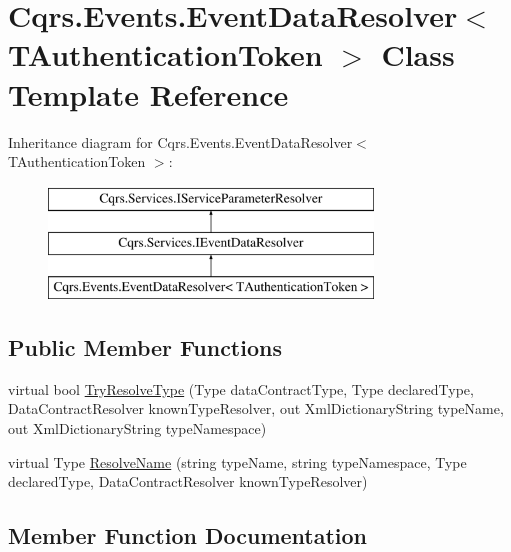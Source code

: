 \hypertarget{classCqrs_1_1Events_1_1EventDataResolver}{}\section{Cqrs.\+Events.\+Event\+Data\+Resolver$<$ T\+Authentication\+Token $>$ Class Template Reference}
\label{classCqrs_1_1Events_1_1EventDataResolver}
Inheritance diagram for Cqrs.\+Events.\+Event\+Data\+Resolver$<$ T\+Authentication\+Token $>$\+:\begin{figure}[H]
\begin{center}
\leavevmode
\includegraphics[height=3.000000cm]{classCqrs_1_1Events_1_1EventDataResolver}
\end{center}
\end{figure}
\subsection*{Public Member Functions}
\begin{DoxyCompactItemize}
\item 
virtual bool \hyperlink{classCqrs_1_1Events_1_1EventDataResolver_a62be7cd15bb38f3a4054a62e787c473d}{Try\+Resolve\+Type} (Type data\+Contract\+Type, Type declared\+Type, Data\+Contract\+Resolver known\+Type\+Resolver, out Xml\+Dictionary\+String type\+Name, out Xml\+Dictionary\+String type\+Namespace)
\item 
virtual Type \hyperlink{classCqrs_1_1Events_1_1EventDataResolver_ade34415acd009dd3f9f3a43169da43e9}{Resolve\+Name} (string type\+Name, string type\+Namespace, Type declared\+Type, Data\+Contract\+Resolver known\+Type\+Resolver)
\end{DoxyCompactItemize}


\subsection{Member Function Documentation}
\mbox{\label{classCqrs_1_1Events_1_1EventDataResolver_ade34415acd009dd3f9f3a43169da43e9}} 
